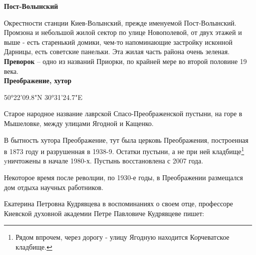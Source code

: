 \textbf{Пост-Волынский}

Окрестности станции Киев-Волынский, прежде именуемой Пост-Волынский. Промзона и небольшой жилой сектор по улице Новополевой, от двух этажей и выше - есть старенький домики, чем-то напоминающие застройку исконной Дарницы, есть советские  панельки. Эта жилая часть района очень зеленая.\\

\textbf{Преворок} – одно из названий Приорки, по крайней мере во второй половине 19 века.\\

\textbf{Преображение, хутор} 

50°22'09.8"N 30°31'24.7"E

Старое народное название лаврской Спасо-Преображенской пустыни, на горе в Мышеловке, между улицами Ягодной и Кащенко. 

   В бытность хутора Преображение, тут была церковь Преображения, построенная в 1873 году и разрушенная в 1938-9. Остатки пустыни, а не при ней кладбище\footnote{Рядом впрочем, через дорогу - улицу Ягодную находится Корчеватское кладбище.} yничтожены в начале 1980-х. Пустынь восстановлена с 2007 года.

Некоторое время после револции, по 1930-е годы, в Преображении размещался дом отдыха научных работников.

Екатерина Петровна Кудрявцева в воспоминаниях о своем отце, профессоре Киевской духовной академии Петре Павловиче Кудрявцеве пишет:

